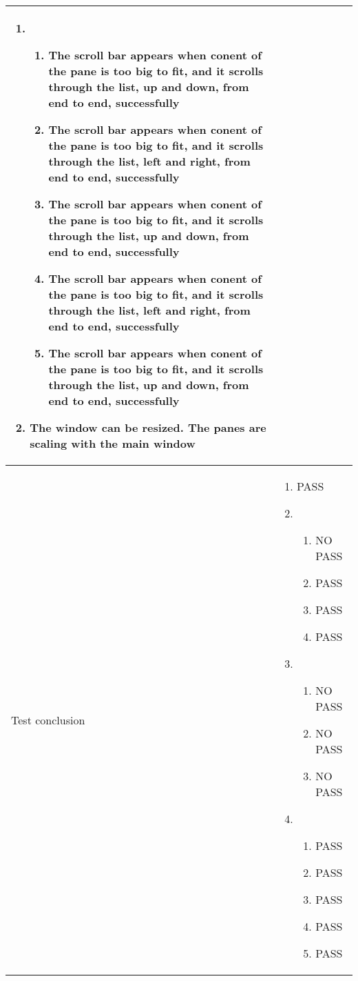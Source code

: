 \documentclass[10pt]{article}
\begin{document}
\begin{center}
\begin{longtable}{ | p{4cm} | p{10cm} | }
\begin{enumerate}
							\item 
							\begin{enumerate}
								\item The scroll bar appears when conent of the pane is too big to fit, and it scrolls through the list, up and down, from end to end, successfully
								\item The scroll bar appears when conent of the pane is too big to fit, and it scrolls through the list, left and right, from end to end, successfully
								\item The scroll bar appears when conent of the pane is too big to fit, and it scrolls through the list, up and down, from end to end, successfully		
								\item The scroll bar appears when conent of the pane is too big to fit, and it scrolls through the list, left and right, from end to end, successfully
								\item The scroll bar appears when conent of the pane is too big to fit, and it scrolls through the list, up and down, from end to end, successfully
							\end{enumerate}

							\item The window can be resized. The panes are scaling with the main window
						\end{enumerate}
							\\ [3pt] \hline

			Test conclusion & 	\begin{enumerate}
							\item PASS

							\item  
							\begin{enumerate}
								\item NO PASS
								\item PASS
								\item PASS
								\item PASS
							\end{enumerate}
							
							\item
							\begin{enumerate}
								\item NO PASS
								\item NO PASS
								\item NO PASS
							\end{enumerate}

							\item 
							\begin{enumerate}																							\item PASS
								\item PASS
								\item PASS
								\item PASS
								\item PASS
							\end{enumerate}


\end{enumerate}
\end{longtable}
\end{center}
\end{document}

